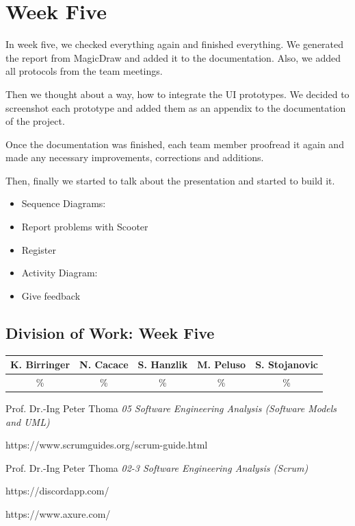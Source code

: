 \documentclass[a4paper, 12pt]{article}
\begin{document}
\section{Week Five}
In week five, we checked everything again and finished everything.
We generated the report from MagicDraw and added it to the documentation.
Also, we added all protocols from the team meetings.

Then we thought about a way, how to integrate the UI prototypes. We decided to screenshot each prototype and added them as an appendix to the documentation of the project.

Once the documentation was finished, each team member proofread it again and made any necessary improvements, corrections and additions.

Then, finally we started to talk about the presentation and started to build it.

\begin{itemize}
\item Sequence Diagrams:
	\item Report problems with Scooter
	\item Register

\item Activity Diagram:
	\item Give feedback
\end{itemize}

\subsection{Division of Work: Week Five}

\begin{table}[h]
\centering
\setlength{\tabcolsep}{10pt}
\begin{tabular}{|c|c|c|c|c|}
\hline
K. Birringer & N. Cacace & S. Hanzlik & M. Peluso & S. Stojanovic\\
\hline
\% & \% & \% & \% & \% \\ 
\hline
\end{tabular}
\end{table}

\newpage    
\begin{thebibliography}{}
Prof. Dr.-Ing Peter Thoma \emph{05 Software Engineering Analysis (Software Models and UML)}

https://www.scrumguides.org/scrum-guide.html

Prof. Dr.-Ing Peter Thoma \emph{02-3 Software Engineering Analysis (Scrum)}
 
https://discordapp.com/
 
https://www.axure.com/

\end{thebibliography}
\end{document}
